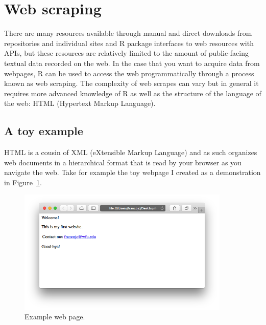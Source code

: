 \documentclass[
  letterpaper,
]{latex/krantz}
\begin{document}
\hypertarget{web-scraping}{%
\section{Web scraping}\label{web-scraping}}

There are many resources available through manual and direct downloads
from repositories and individual sites and R package interfaces to web
resources with APIs, but these resources are relatively limited to the
amount of public-facing textual data recorded on the web. In the case
that you want to acquire data from webpages, R can be used to access the
web programmatically through a process known as web scraping. The
complexity of web scrapes can vary but in general it requires more
advanced knowledge of R as well as the structure of the language of the
web: HTML (Hypertext Markup Language).

\hypertarget{a-toy-example}{%
\subsection{A toy example}\label{a-toy-example}}

HTML is a cousin of XML (eXtensible Markup Language) and as such
organizes web documents in a hierarchical format that is read by your
browser as you navigate the web. Take for example the toy webpage I
created as a demonstration in Figure~\ref{fig-ad-example-webpage}.

\begin{figure}[h]

{\centering \includegraphics[width=0.9\textwidth,height=\textheight]{./figures/acquire-data/example-webpage.png}

}

\caption{\label{fig-ad-example-webpage}Example web page.}

\end{figure}
\end{document}
